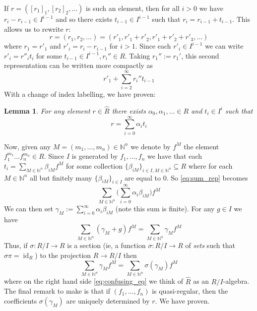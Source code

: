 \documentclass[12pt]{article}
\theoremstyle{plain}
\newtheorem{lemma}[thm]{Lemma}
\theoremstyle{definition}
\newcommand{\bb}[1]{\mathbb{#1}}
\newcommand{\lto}{\longrightarrow}
\begin{document}
If $r = ([r_1]_1, [r_2]_2, \ldots)$ is such an element, then for all $i > 0$ we have $r_{i} - r_{i-1} \in I^{i-1}$ and so there exists $t_{i-1} \in I^{i-1}$ such that $r_{i} = r_{i-1} + t_{i-1}$. This allows us to rewrite $r$:
\begin{equation}
	r = (r_1, r_2, \ldots) = (r'_1, r'_1 + r'_2, r'_1 + r'_2 + r'_3, \ldots)
	\end{equation}
where $r_1 = r'_1$ and $r'_i = r_i - r_{i-1}$ for $i > 1$. Since each $r'_i \in I^{i-1}$ we can write $r'_i = r''_i t_i$ for some $t_{i-1} \in I^{i-1}, r_i'' \in R$. Taking $r_1'' := r_1'$, this second representation can be written more compactly as
\begin{equation}\label{eq:sum_rep}
	r'_1 + \sum_{i = 2}^\infty r_i'' t_{i-1}
	\end{equation}
With a change of index labelling, we have proven:
\begin{lemma}
	For any element $r \in \hat{R}$ there exists $\alpha_0, \alpha_1, \ldots \in R$ and $t_i \in I^{i}$ such that
	\begin{equation}
		r = \sum_{i = 0}^\infty \alpha_i t_i
		\end{equation}
	\end{lemma}
Now, given any $M = (m_1, \ldots, m_n) \in \bb{N}^n$ we denote by $f^M$ the element $f_1^{m_1}\ldots f_n^{m_n} \in R$. Since $I$ is generated by $f_1, \ldots, f_n$ we have that each $t_i = \sum_{M \in \bb{N}^n}\beta_{iM} f^M$ for some collection $\{ \beta_{iM} \}_{i \in I, M \in \bb{N}^n} \subseteq R$ where for each $M \in \bb{N}^n$ all but finitely many $\{ \beta_{iM} \}_{i \in I}$ are equal to $0$. So \eqref{eq:sum_rep} becomes
\begin{equation}
	\sum_{M \in \bb{N}^n}\Big(\sum_{i = 0}^\infty \alpha_i \beta_{iM}\Big) f^M
	\end{equation}
We can then set $\gamma_M := \sum_{i = 0}^\infty \alpha_i\beta_{iM}$ (note this sum is finite). For any $g \in I$ we have
\begin{equation}
	\sum_{M \in \bb{N}^n}(\gamma_M + g)f^M = \sum_{M \in \bb{N}^n}\gamma_M f^M
	\end{equation}
Thus, if $\sigma: R/I \lto R$ is a section (ie, a function $\sigma:R/I \lto R$ of \emph{sets} such that $\sigma \pi = \operatorname{id}_R$) to the projection $R \lto R/I$ then
\begin{equation}\label{eq:confusing_eq}
	\sum_{M \in \bb{N}^n}\gamma_M f^M = \sum_{M \in \bb{N}^n}\sigma(\gamma_M) f^M
	\end{equation}
where on the right hand side \eqref{eq:confusing_eq} we think of $\hat{R}$ as an $R/I$-algebra. The final remark to make is that if $(f_1, \ldots, f_n)$ is quasi-regular, then the coefficients $\sigma(\gamma_M)$ are uniquely determined by $r$. We have proven.
\end{document}
